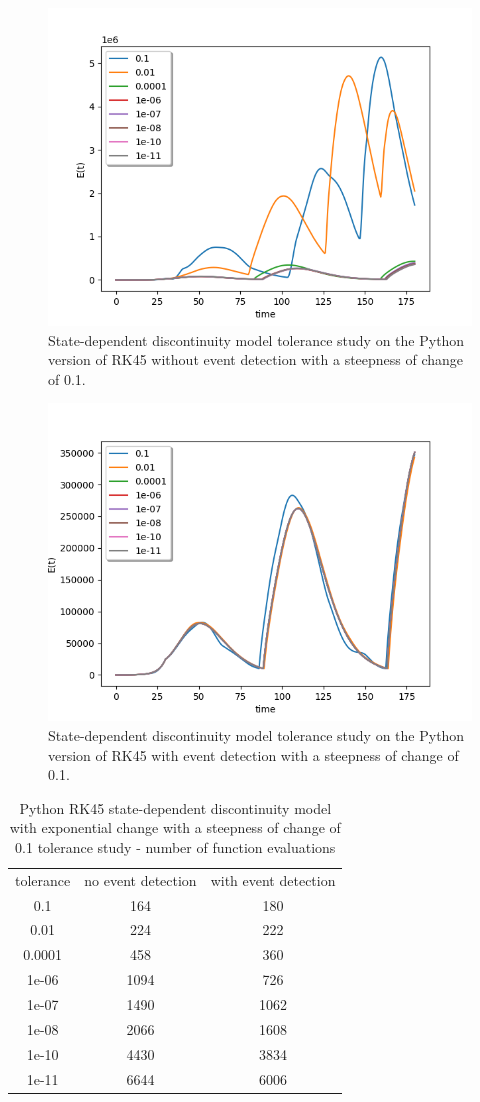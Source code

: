 \begin{figure}[H]
\centering
\includegraphics[width=0.7\linewidth]{./figures/exp_state_tol_rk45_no_event_0_1}
\caption{State-dependent discontinuity model tolerance study on the Python version of RK45 without event detection with a steepness of change of 0.1.}
\label{fig:exp_state_tol_rk45_no_event_0_1}
\end{figure}

\begin{figure}[H]
\centering
\includegraphics[width=0.7\linewidth]{./figures/exp_state_tol_rk45_event_0_1}
\caption{State-dependent discontinuity model tolerance study on the Python version of RK45 with event detection with a steepness of change of 0.1.}
\label{fig:exp_state_tol_rk45_event_0_1}
\end{figure}

\begin{table}[H]
\caption {Python RK45 state-dependent discontinuity model with exponential change with a steepness of change of 0.1 tolerance study - number of function evaluations} \label{tab:exp_state_tol_rk45_0_1} 
\begin{center}
\begin{tabular}{ c c c }
tolerance & no event detection & with event detection \\ 
0.1 & 164 & 180 \\
0.01 & 224 & 222 \\
0.0001 & 458 & 360 \\
1e-06 & 1094 & 726 \\
1e-07 & 1490 & 1062 \\
1e-08 & 2066 & 1608 \\
1e-10 & 4430 & 3834 \\
1e-11 & 6644 & 6006 \\
\end{tabular}
\end{center}
\end{table}


